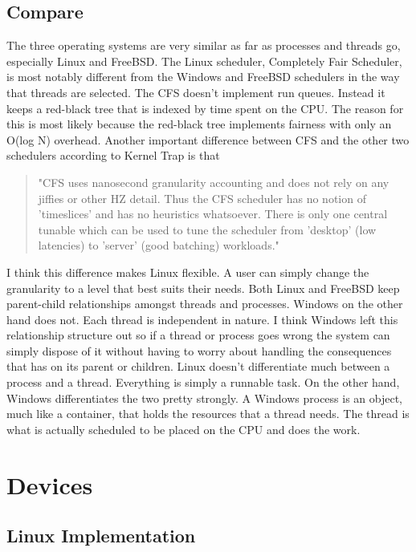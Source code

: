 \documentclass[onecolumn,draftclsnofoot, 10pt, compsoc]{IEEEtran}
\begin{document}
	
	\subsection{Compare}
		The three operating systems are very similar as far as processes and threads go, especially Linux and FreeBSD. 
		The Linux scheduler, Completely Fair Scheduler, is most notably different from the Windows and FreeBSD schedulers in the way that threads are selected. 
		The CFS doesn't implement run queues. 
		Instead it keeps a red-black tree that is indexed by time spent on the CPU. 
		The reason for this is most likely because the red-black tree implements fairness with only an O(log N) overhead. 
		Another important difference between CFS and the other two schedulers according to Kernel Trap is that 
		
		\begin{quote}
			"CFS uses nanosecond granularity accounting and does not rely on any jiffies or other HZ detail. Thus the CFS scheduler has no notion of 'timeslices' and has no heuristics whatsoever. There is only one central tunable which can be used to tune the scheduler from 'desktop' (low latencies) to 'server' (good batching) workloads."\cite{CFSTimeSliceDifference}
		\end{quote}

		I think this difference makes Linux flexible. A user can simply change the granularity to a level that best suits their needs.
		Both Linux and FreeBSD keep parent-child relationships amongst threads and processes. Windows on the other hand does not. 
		Each thread is independent in nature. I think Windows left this relationship structure out so if a thread or process goes wrong the system can simply dispose of it without having to worry about handling the consequences that has on its parent or children.
		Linux doesn't differentiate much between a process and a thread. 
		Everything is simply a runnable task. 
		On the other hand, Windows differentiates the two pretty strongly. 
		A Windows process is an object, much like a container, that holds the resources that a thread needs. 
		The thread is what is actually scheduled to be placed on the CPU and does the work.



\section{Devices}
	\subsection{Linux Implementation}
\end{document}
